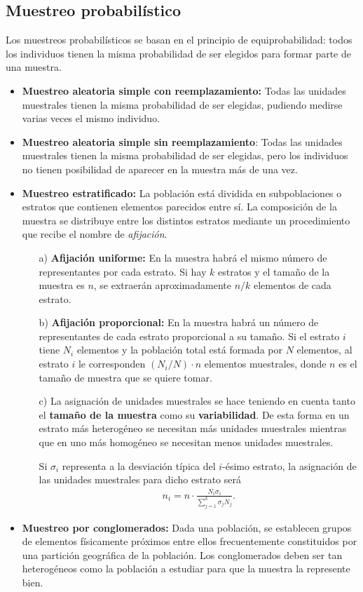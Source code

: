 \subsection{Muestreo probabilístico}
Los muestreos probabilísticos se basan en el principio de equiprobabilidad: todos los individuos tienen la misma probabilidad de ser elegidos para formar parte de una muestra.
\begin{itemize}
    \item \textbf{Muestreo aleatoria simple con reemplazamiento:} Todas las unidades muestrales tienen la misma probabilidad de ser elegidas, pudiendo medirse varias veces el mismo individuo.
    \item \textbf{Muestreo aleatoria simple sin reemplazamiento}: Todas las unidades muestrales tienen la misma probabilidad de ser elegidas, pero los individuos no tienen posibilidad de aparecer en la muestra más de una vez.
    \item \textbf{Muestreo estratificado:} La población está dividida en subpoblaciones o estratos que contienen elementos parecidos entre sí. La composición de la muestra se distribuye entre los distintos estratos mediante un procedimiento que recibe el nombre de \textit{afijación}.
          \begin{enumerate}
              \item[a)] \textbf{Afijación uniforme:} En la muestra habrá el mismo número de representantes por cada estrato. Si hay $k$ estratos y el tamaño de la muestra es $n$, se extraerán aproximadamente $n/k$ elementos de cada estrato.
              \item[b)] \textbf{Afijación proporcional:} En la muestra habrá un número de representantes de cada estrato proporcional a su tamaño. Si el estrato $i$ tiene $N_i$ elementos y la población total está formada por $N$ elementos, al estrato $i$ le corresponden $(N_i/N) \cdot n$ elementos muestrales, donde $n$ es el tamaño de muestra que se quiere tomar.
              \item[c)] La asignación de unidades muestrales se hace teniendo en cuenta tanto el \textbf{tamaño de la muestra} como su \textbf{variabilidad}. De esta forma en un estrato más heterogéneo se necesitan más unidades muestrales mientras que en uno más homogéneo se necesitan menos unidades muestrales.

                    Si $\sigma_i$ representa a la desviación típica del $i$-ésimo estrato, la asignación de las unidades muestrales para dicho estrato será
                    \begin{align*}
                        n_i = n \cdot \frac{N_i \sigma_i}{\sum_{j=1}^{k}{\sigma_j N_j}}.
                    \end{align*}
          \end{enumerate}
    \item \textbf{Muestreo por conglomerados:} Dada una población, se establecen grupos de elementos físicamente próximos entre ellos frecuentemente constituidos por una partición geográfica de la población. Los conglomerados deben ser tan heterogéneos como la población a estudiar para que la muestra la represente bien.


\end{itemize}
